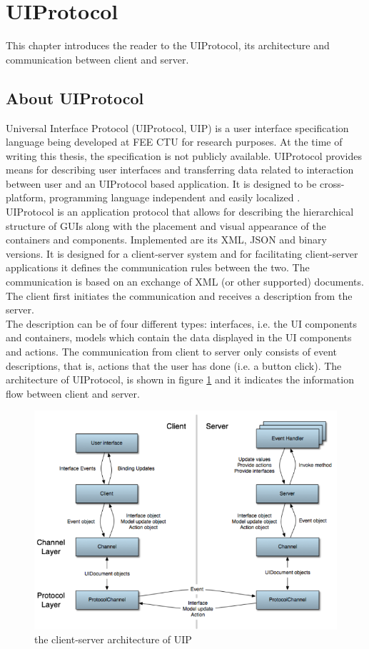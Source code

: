 \section{UIProtocol}
This chapter introduces the reader to the UIProtocol, its architecture and communication between client and server.

\subsection{About UIProtocol}
Universal Interface Protocol (UIProtocol, UIP) is a user interface specification language \cite{uip} being developed at FEE CTU for research purposes. At the time of writing this thesis, the specification is not publicly available. UIProtocol provides means for describing user interfaces and transferring data related to interaction between user and an UIProtocol based application. It is designed to be cross-platform, programming language independent and easily localized \cite{uip}.\\
UIProtocol is an application protocol that allows for describing the hierarchical structure of GUIs along with the placement and visual appearance of the containers and components. Implemented are its XML, JSON and binary versions. It is designed for a client-server system and for facilitating client-server applications it defines the communication rules between the two. The communication is based on an exchange of XML (or other supported) documents. The client first initiates the communication and receives a description from the server.\\The description can be of four different types: interfaces, i.e. the UI components and containers, models which contain the data displayed in the UI components and actions. The communication from client to server only consists of event descriptions, that is, actions that the user has done (i.e. a button click). The architecture of UIProtocol, is shown in figure \ref{fig:UIParchitecture} and it indicates the information flow between client and server.

\begin{figure}[ht!]
\centering
\includegraphics[width=135mm]{pics/UIParchitecture.png}
\caption{the client-server architecture of UIP}
\label{fig:UIParchitecture}
\end{figure}
\pagebreak

